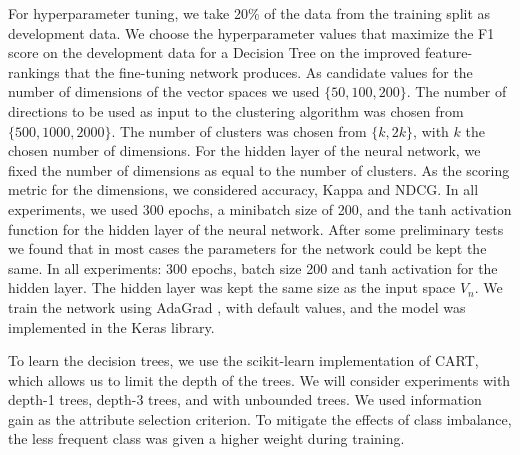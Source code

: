 For hyperparameter tuning, we take 20\% of the data from the training split as development data. %
We choose the hyperparameter values that maximize the F1 score on the development data for a Decision Tree on the improved feature-rankings that the fine-tuning network produces.  As candidate values for the number of dimensions of the vector spaces we used $\{50, 100, 200\}$. The number of directions to be used as input to the clustering algorithm was chosen from $\{500, 1000, 2000\}$. The number of clusters was chosen from $\{k,2k\}$, with $k$ the chosen number of dimensions. For the hidden layer of the neural network, we fixed the number of dimensions as equal to the number of clusters. As the scoring metric for the dimensions, we considered accuracy, Kappa and NDCG. In all experiments, we used 300 epochs, a minibatch size of 200, and the tanh activation function for the hidden layer of the neural network.
After some preliminary tests we found that in most cases the parameters for the network could be kept the same. In all experiments: 300 epochs,  batch size 200 and tanh activation for the hidden layer. The hidden layer was kept the same size as the input space $V_n$. 
We train the network using AdaGrad \cite{Duchi2011}, with default values, and the model was implemented in the Keras library. %


To learn the decision trees, we use the scikit-learn implementation of CART, which allows us to limit the depth of the trees.
We will consider experiments with depth-1 trees, depth-3 trees, and with unbounded trees.  We used information gain as the attribute selection criterion. 
To mitigate the effects of class imbalance, the less frequent class was given a higher weight during training.  


